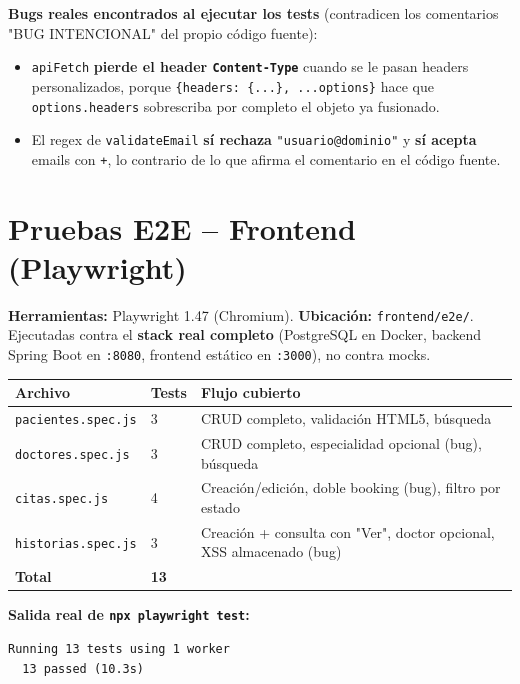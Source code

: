 \documentclass[11pt,a4paper]{article}
\begin{document}
\textbf{Bugs reales encontrados al ejecutar los tests} (contradicen los
comentarios "BUG INTENCIONAL" del propio c\'odigo fuente):
\begin{itemize}[nosep]
  \item \texttt{apiFetch} \textbf{pierde el header \texttt{Content-Type}}
    cuando se le pasan headers personalizados, porque
    \texttt{\{headers: \{...\}, ...options\}} hace que \texttt{options.headers}
    sobrescriba por completo el objeto ya fusionado.
  \item El regex de \texttt{validateEmail} \textbf{s\'i rechaza}
    \texttt{"usuario@dominio"} y \textbf{s\'i acepta} emails con \texttt{+},
    lo contrario de lo que afirma el comentario en el c\'odigo fuente.
\end{itemize}

\section{Pruebas E2E -- Frontend (Playwright)}

\textbf{Herramientas:} Playwright 1.47 (Chromium). \textbf{Ubicaci\'on:}
\texttt{frontend/e2e/}. Ejecutadas contra el \textbf{stack real completo}
(PostgreSQL en Docker, backend Spring Boot en \texttt{:8080}, frontend
est\'atico en \texttt{:3000}), no contra mocks.

\begin{longtable}{@{}p{5cm}p{2.5cm}p{6.5cm}@{}}
\toprule
\textbf{Archivo} & \textbf{Tests} & \textbf{Flujo cubierto} \\
\midrule
\endhead
\texttt{pacientes.spec.js} & 3 & CRUD completo, validaci\'on HTML5, b\'usqueda \\
\texttt{doctores.spec.js} & 3 & CRUD completo, especialidad opcional (bug), b\'usqueda \\
\texttt{citas.spec.js} & 4 & Creaci\'on/edici\'on, doble booking (bug), filtro por estado \\
\texttt{historias.spec.js} & 3 & Creaci\'on + consulta con "Ver", doctor opcional, XSS almacenado (bug) \\
\midrule
\textbf{Total} & \textbf{13} & \\
\bottomrule
\end{longtable}

\textbf{Salida real de \texttt{npx playwright test}:}
\begin{lstlisting}
Running 13 tests using 1 worker
  13 passed (10.3s)
\end{lstlisting}
\end{document}

